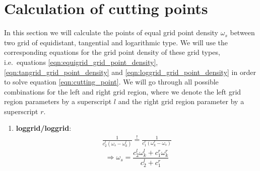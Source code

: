 \section{Calculation of cutting points}\label{sec:app_cutting_points}
In this section we will calculate the points of equal grid point density $\omega_s$ between two grid of equidistant, tangential and logarithmic type. We will use the corresponding equations for the grid point density of these grid types, i.e.~equations \ref{eqn:equigrid_grid_point_density}, \ref{eqn:tangrid_grid_point_density} and \ref{eqn:loggrid_grid_point_density} in order to solve equation \ref{eqn:cutting_point}. We will go through all possible combinations for the left and right grid region, where we denote the left grid region parameters by a superscript $l$ and the right grid region parameter by a superscript $r$.
\begin{enumerate}
	\item {\bf loggrid/loggrid}:
		\begin{align*}
			\frac{1}{c_2^l(\omega_s-\omega_k^l)}\stackrel{!}{=}\frac{1}{c_1^r(\omega_k^r-\omega_s)}
		\end{align*}
		\[
		 	\Rightarrow \boxed{\omega_s=\frac{c_2^l\omega_k^l + c_1^r\omega_k^r}{c_2^l+c_1^r}}
		\]


\end{enumerate}
